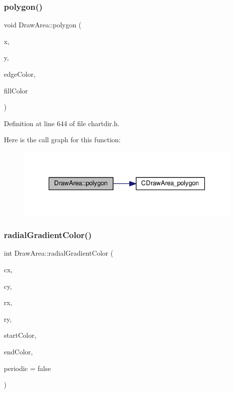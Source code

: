 \subsubsection{\texorpdfstring{polygon()}{polygon()}\hspace{0.1cm}{\footnotesize\ttfamily [3/3]}}
{\footnotesize\ttfamily void Draw\+Area\+::polygon (\begin{DoxyParamCaption}\item[{\hyperlink{class_double_array}{Double\+Array}}]{x,  }\item[{\hyperlink{class_double_array}{Double\+Array}}]{y,  }\item[{int}]{edge\+Color,  }\item[{int}]{fill\+Color }\end{DoxyParamCaption})\hspace{0.3cm}{\ttfamily [inline]}}



Definition at line 644 of file chartdir.\+h.

Here is the call graph for this function\+:
\nopagebreak
\begin{figure}[H]
\begin{center}
\leavevmode
\includegraphics[width=323pt]{class_draw_area_ac562a79e307037789a5cabaebde77256_cgraph}
\end{center}
\end{figure}
\mbox{\label{class_draw_area_a2cbc34103fc8149714d6f2a9a7a6168c}} 
\subsubsection{\texorpdfstring{radial\+Gradient\+Color()}{radialGradientColor()}\hspace{0.1cm}{\footnotesize\ttfamily [1/2]}}
{\footnotesize\ttfamily int Draw\+Area\+::radial\+Gradient\+Color (\begin{DoxyParamCaption}\item[{int}]{cx,  }\item[{int}]{cy,  }\item[{int}]{rx,  }\item[{int}]{ry,  }\item[{int}]{start\+Color,  }\item[{int}]{end\+Color,  }\item[{bool}]{periodic = {\ttfamily false} }\end{DoxyParamCaption})\hspace{0.3cm}{\ttfamily [inline]}}



